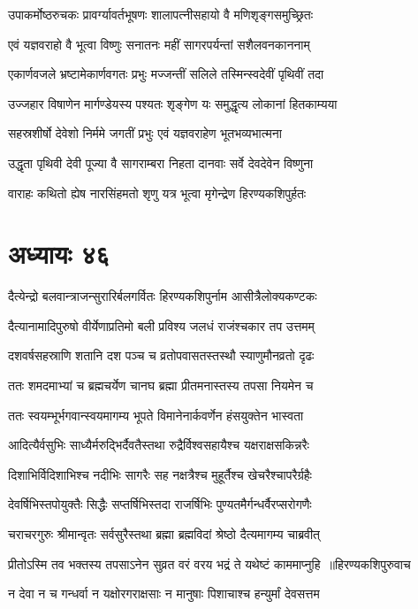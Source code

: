 \twolineshloka
{उपाकर्मोष्ठरुचकः प्रावर्ग्यावर्तभूषणः}
{शालापत्नीसहायो वै मणिशृङ्गसमुच्छ्रितः}


\twolineshloka
{एवं यज्ञवराहो वै भूत्वा विष्णुः सनातनः}
{महीं सागरपर्यन्तां सशैलवनकाननाम्}


\twolineshloka
{एकार्णवजले भ्रष्टामेकार्णवगतः प्रभुः}
{मज्जन्तीं सलिले तस्मिन्स्वदेवीं पृथिवीं तदा}


\twolineshloka
{उज्जहार विषाणेन मार्गण्डेयस्य पश्यतः}
{शृङ्गेण यः समुद्धृत्य लोकानां हितकाम्यया}


\twolineshloka
{सहस्रशीर्षो देवेशो निर्ममे जगतीं प्रभुः}
{एवं यज्ञवराहेण भूतभव्यभात्मना}


\twolineshloka
{उद्धृता पृथिवी देवी पूज्या वै सागराम्बरा}
{निहता दानवाः सर्वे देवदेवेन विष्णुना}


\twolineshloka
{वाराहः कथितो ह्येष नारसिंहमतो शृणु}
{यत्र भूत्वा मृगेन्द्रेण हिरण्यकशिपुर्हतः}


\chapter{अध्यायः ४६}
\twolineshloka
{दैत्येन्द्रो बलवान्त्राजन्सुरारिर्बलगर्वितः}
{हिरण्यकशिपुर्नाम आसीत्रैलोक्यकण्टकः}


\twolineshloka
{दैत्यानामादिपुरुषो वीर्येणाप्रतिमो बली}
{प्रविश्य जलधं राजंश्चकार तप उत्तमम्}


\twolineshloka
{दशवर्षसहस्राणि शतानि दश पञ्च च}
{व्रतोपवासतस्तस्थौ स्याणुमौनव्रतो दृढः}


\twolineshloka
{ततः शमदमाभ्यां च ब्रह्मचर्येण चानघ}
{ब्रह्मा प्रीतमनास्तस्य तपसा नियमेन च}


\twolineshloka
{ततः स्वयम्भूर्भगवान्स्वयमागम्य भूपते}
{विमानेनार्कवर्णेन हंसयुक्तेन भास्वता}


\twolineshloka
{आदित्यैर्वसुभिः साध्यैर्मरुद्भिर्दैवतैस्तथा}
{रुद्रैर्विश्वसहायैश्च यक्षराक्षसकिन्नरैः}


\twolineshloka
{दिशाभिर्विदिशाभिश्च नदीभिः सागरैः सह}
{नक्षत्रैश्च मुहूर्तैश्च खेचरैश्चापरैर्ग्रहैः}


\twolineshloka
{देवर्षिभिस्तपोयुक्तैः सिद्धैः सप्तर्षिभिस्तदा}
{राजर्षिभिः पुण्यतमैर्गन्धर्वैरप्सरोगणैः}


\twolineshloka
{चराचरगुरुः श्रीमान्वृतः सर्वसुरैस्तथा}
{ब्रह्मा ब्रह्मविदां श्रेष्ठो दैत्यमागम्य चाब्रवीत्}


\threelineshloka
{प्रीतोऽस्मि तव भक्तस्य तपसाऽनेन सुव्रत}
{वरं वरय भद्रं ते यथेष्टं काममाप्नुहि ॥हिरण्यकशिपुरुवाच}
{}


\twolineshloka
{न देवा न च गन्धर्वा न यक्षोरगराक्षसाः}
{न मानुषाः पिशाचाश्च हन्युर्मां देवसत्तम}


